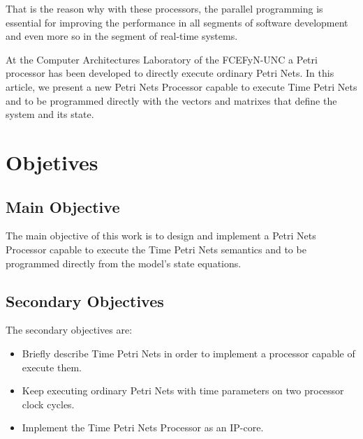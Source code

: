 That is the reason why with these processors, the parallel programming is essential for improving 
 the performance in all segments of software development and even more so in the segment of real-time
 systems.
 
At the Computer Architectures Laboratory of the FCEFyN-UNC a Petri processor has been developed to 
 directly execute ordinary Petri Nets. In this article, we present a new Petri Nets Processor capable
 to execute Time Petri Nets and to be programmed directly with the vectors and matrixes that define 
 the system and its state.
	
 \section{Objetives}

	\subsection{Main Objective} 
	The main objective of this work is to design and implement a Petri Nets Processor capable to 
	execute the Time Petri Nets semantics and to be programmed directly from the model's state 
	equations.
	
	\subsection{Secondary Objectives}
	The secondary objectives are:
	\begin{itemize}
		\item Briefly describe Time Petri Nets in order to implement a processor capable of execute them.
		\item Keep executing ordinary Petri Nets with time parameters on two processor clock cycles.
		\item Implement the Time Petri Nets Processor as an IP-core.
	\end{itemize}
